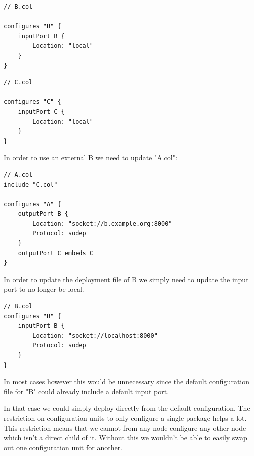 \begin{verbatim}
// B.col

configures "B" {
    inputPort B {
        Location: "local"
    }
}
\end{verbatim}

\begin{verbatim}
// C.col

configures "C" {
    inputPort C {
        Location: "local"
    }
}
\end{verbatim}

In order to use an external B we need to update "A.col":

\begin{verbatim}
// A.col
include "C.col"

configures "A" {
    outputPort B {
        Location: "socket://b.example.org:8000"
        Protocol: sodep
    }
    outputPort C embeds C
}
\end{verbatim}

In order to update the deployment file of B we simply need to update the
input port to no longer be local.

\begin{verbatim}
// B.col
configures "B" {
    inputPort B {
        Location: "socket://localhost:8000"
        Protocol: sodep
    }
}
\end{verbatim}

In most cases however this would be unnecessary since the default
configuration file for "B" could already include a default input port.

In that case we could simply deploy directly from the default configuration.
The restriction on configuration units to only configure a single package helps
a lot. This restriction means that we cannot from any node configure any other
node which isn't a direct child of it. Without this we wouldn't be able to
easily swap out one configuration unit for another.


